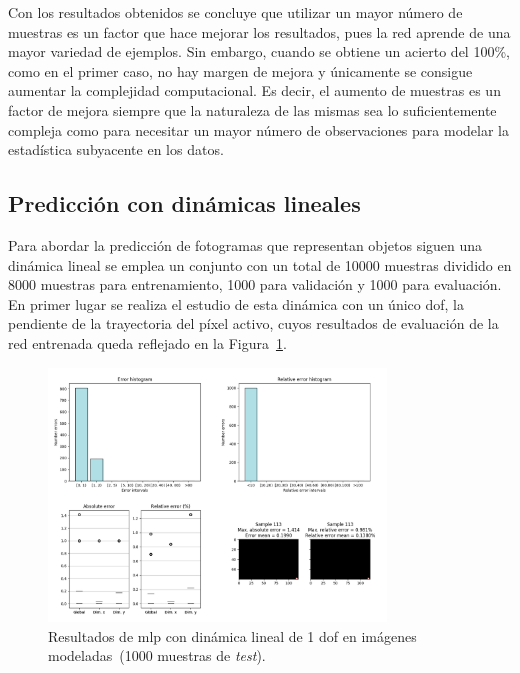 Con los resultados obtenidos se concluye que utilizar un mayor número de muestras es un factor que hace mejorar los resultados, pues la red aprende de una mayor variedad de ejemplos. Sin embargo, cuando se obtiene un acierto del 100\%, como en el primer caso, no hay margen de mejora y únicamente se consigue aumentar la complejidad computacional. Es decir, el aumento de muestras es un factor de mejora siempre que la naturaleza de las mismas sea lo suficientemente compleja como para necesitar un mayor número de observaciones para modelar la estadística subyacente en los datos.

\subsection{Predicción con dinámicas lineales}
Para abordar la predicción de fotogramas que representan objetos siguen una dinámica lineal se emplea un conjunto con un total de 10000 muestras dividido en 8000 muestras para entrenamiento, 1000 para validación y 1000 para evaluación.\\

En primer lugar se realiza el estudio de esta dinámica con un único \acrshort{dof}, la pendiente de la trayectoria del píxel activo, cuyos resultados de evaluación de la red entrenada queda reflejado en la Figura~\ref{fig.norec_lin_fix_10000}.

\begin{figure}[H]
		\begin{center}
			\includegraphics[width=0.8\textwidth]{ figures/test_mod/NOREC/linear_fix_10000.png}
			\caption{Resultados de \acrshort{mlp} con dinámica lineal de 1 \acrshort{dof} en imágenes modeladas~(1000 muestras de \textit{test}).} 
			\label{fig.norec_lin_fix_10000}
		\end{center}
\end{figure}
\vspace{-10pt}

